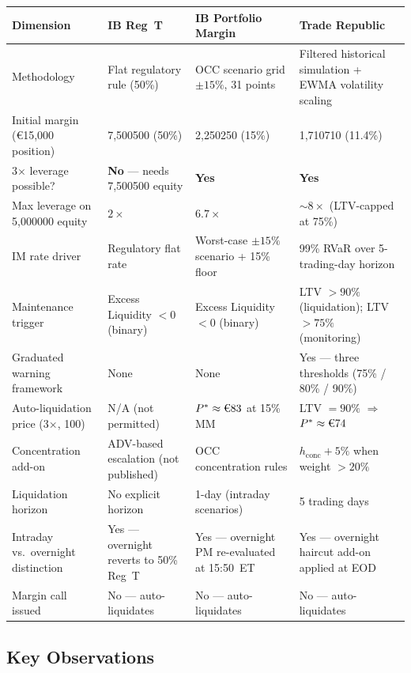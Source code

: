 \documentclass[9pt, a4paper]{extarticle}
\newcommand{\EUR}[1]{\ifmmode\text{\texteuro}#1\else\texteuro#1\fi}
\begin{document}
\begin{tabularx}{\linewidth}{lXXX}
\toprule
\textbf{Dimension} & \textbf{IB Reg~T} & \textbf{IB Portfolio Margin} & \textbf{Trade Republic} \\
\midrule
Methodology
  & Flat regulatory rule (50\%)
  & OCC scenario grid $\pm 15\%$, 31 points
  & Filtered historical simulation + EWMA volatility scaling \\
Initial margin (€15,000 position)
  & \EUR{7{,}500} (50\%)
  & \EUR{2{,}250} (15\%)
  & \EUR{1{,}710} (11.4\%) \\
3$\times$ leverage possible?
  & \textbf{No} — needs \EUR{7{,}500} equity
  & \textbf{Yes}
  & \textbf{Yes} \\
Max leverage on \EUR{5{,}000} equity
  & $2{\times}$
  & $6.7{\times}$
  & ${\sim}8{\times}$ (LTV-capped at 75\%) \\
IM rate driver
  & Regulatory flat rate
  & Worst-case $\pm 15\%$ scenario + 15\% floor
  & 99\% RVaR over 5-trading-day horizon \\
Maintenance trigger
  & Excess Liquidity $< 0$ (binary)
  & Excess Liquidity $< 0$ (binary)
  & LTV $> 90\%$ (liquidation); LTV $> 75\%$ (monitoring) \\
Graduated warning framework
  & None
  & None
  & Yes — three thresholds (75\% / 80\% / 90\%) \\
Auto-liquidation price (3$\times$, \EUR{100})
  & N/A (not permitted)
  & $P^{*} \approx \EUR{83}$ at 15\% MM
  & LTV $= 90\%$ $\Rightarrow$ $P^{*} \approx \EUR{74}$ \\
Concentration add-on
  & ADV-based escalation (not published)
  & OCC concentration rules
  & $h_{\mathrm{conc}} + 5\%$ when weight $> 20\%$ \\
Liquidation horizon
  & No explicit horizon
  & 1-day (intraday scenarios)
  & 5 trading days \\
Intraday vs.\ overnight distinction
  & Yes — overnight reverts to 50\% Reg~T
  & Yes — overnight PM re-evaluated at 15:50~ET
  & Yes — overnight haircut add-on applied at EOD \\
Margin call issued
  & No — auto-liquidates
  & No — auto-liquidates
  & No — auto-liquidates \\
\bottomrule
\end{tabularx}

\bigskip

\subsection*{Key Observations}
\end{document}
